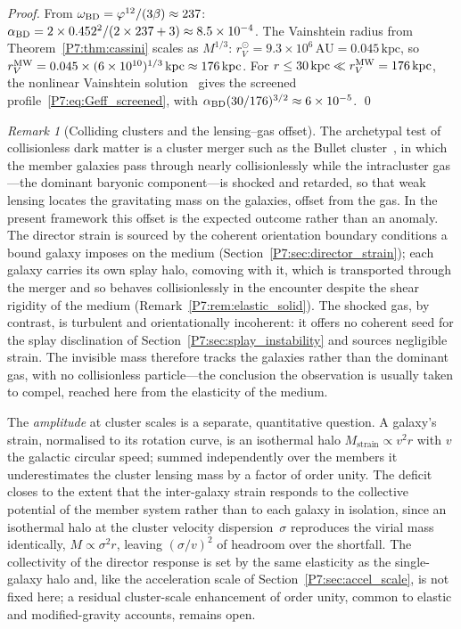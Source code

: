 \documentclass[11pt,a4paper]{article}
\theoremstyle{definition}
\theoremstyle{remark}
\newtheorem{remark}[theorem]{Remark}
\newcommand{\vp}{\varphi}
\begin{document}
\begin{proof}
From $\omega_{\rm BD}=\vp^{12}/(3\beta)\approx237$:
$\alpha_{\rm BD}=2\times0.452^2/(2\times237+3)\approx8.5\times10^{-4}$.
The Vainshtein radius from Theorem~\ref{P7:thm:cassini} scales as $M^{1/3}$:
$r_V^\odot = 9.3\times10^6\,\mathrm{AU} = 0.045\,\mathrm{kpc}$,
so $r_V^{\rm MW} = 0.045\times(6\times10^{10})^{1/3}\,\mathrm{kpc}
\approx176\,\mathrm{kpc}$.
For $r\leq30\,\mathrm{kpc}\ll r_V^{\rm MW}=176\,\mathrm{kpc}$,
the nonlinear Vainshtein solution~\cite{BabichevDeffayet2013} gives the
screened profile~\eqref{P7:eq:Geff_screened}, with
$\alpha_{\rm BD}(30/176)^{3/2}\approx6\times10^{-5}$.
\qed
\end{proof}

\begin{remark}[Colliding clusters and the lensing--gas offset]
\label{P7:rem:bullet}
The archetypal test of collisionless dark matter is a cluster merger
such as the Bullet cluster~\cite{Clowe2006}, in which the member
galaxies pass through nearly collisionlessly while the intracluster
gas---the dominant baryonic component---is shocked and retarded, so
that weak lensing locates the gravitating mass on the galaxies,
offset from the gas.  In the present framework this offset is the
expected outcome rather than an anomaly.  The director strain is
sourced by the coherent orientation boundary conditions a bound
galaxy imposes on the medium (Section~\ref{P7:sec:director_strain});
each galaxy carries its own splay halo, comoving with it, which is
transported through the merger and so behaves collisionlessly in the
encounter despite the shear rigidity of the medium
(Remark~\ref{P7:rem:elastic_solid}).  The shocked gas, by contrast,
is turbulent and orientationally incoherent: it offers no coherent
seed for the splay disclination of
Section~\ref{P7:sec:splay_instability} and sources negligible strain.
The invisible mass therefore tracks the galaxies rather than the
dominant gas, with no collisionless particle---the conclusion the
observation is usually taken to compel, reached here from the
elasticity of the medium.

The \emph{amplitude} at cluster scales is a separate, quantitative
question.  A galaxy's strain, normalised to its rotation curve, is an
isothermal halo $M_{\mathrm{strain}}\propto v^{2}r$ with $v$ the
galactic circular speed; summed independently over the members it
underestimates the cluster lensing mass by a factor of order unity.
The deficit closes to the extent that the inter-galaxy strain
responds to the collective potential of the member system rather than
to each galaxy in isolation, since an isothermal halo at the cluster
velocity dispersion~$\sigma$ reproduces the virial mass identically,
$M\propto\sigma^{2}r$, leaving $(\sigma/v)^{2}$ of headroom over the
shortfall.  The collectivity of the director response is set by the
same elasticity as the single-galaxy halo and, like the acceleration
scale of Section~\ref{P7:sec:accel_scale}, is not fixed here; a
residual cluster-scale enhancement of order unity, common to elastic
and modified-gravity accounts, remains open.
\end{remark}
\end{document}
